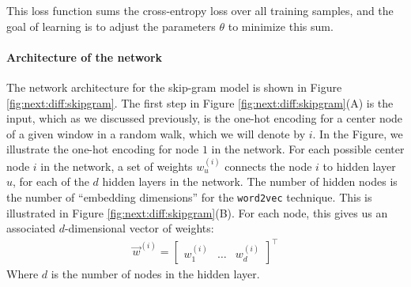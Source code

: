 This loss function sums the cross-entropy loss over all training samples, and the goal of learning is to adjust the parameters $\theta$ to minimize this sum.



\paragraph*{Architecture of the network}

The network architecture for the skip-gram model is shown in Figure \ref{fig:next:diff:skipgram}. The first step in Figure \ref{fig:next:diff:skipgram}(A) is the input, which as we discussed previously, is the one-hot encoding for a center node of a given window in a random walk, which we will denote by $i$. In the Figure, we illustrate the one-hot encoding for node $1$ in the network. For each possible center node $i$ in the network, a set of weights $w^{(i)}_u$ connects the node $i$ to hidden layer $u$, for each of the $d$ hidden layers in the network. The number of hidden nodes is the number of ``embedding dimensions'' for the \texttt{word2vec} technique. This is illustrated in Figure \ref{fig:next:diff:skipgram}(B). For each node, this gives us an associated $d$-dimensional vector of weights:
\begin{align*}
    \vec w^{(i)} = \begin{bmatrix}
        w^{(i)}_1 & \hdots &  w^{(i)}_d
    \end{bmatrix}^\top
\end{align*}
Where $d$ is the number of nodes in the hidden layer.

